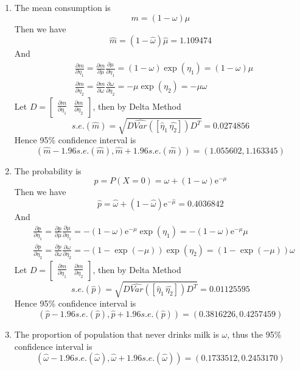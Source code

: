 \documentclass{article}
\begin{document}
\begin{enumerate}[leftmargin = 0 em, label = \arabic*., font = \bfseries]
\begin{enumerate}
		   \item 
		   The mean consumption is
		   \[m = (1 - \omega) \mu\]
		   Then we have
		   \[\hat{m} = (1 - \hat{\omega}) \hat{\mu} = 1.109474 \]
		   And
		   \begin{align*}
		    &\frac{\partial m}{\partial \eta_1} = \frac{\partial m}{\partial \mu} \frac{\partial \mu}{\partial \eta_1} = (1 - \omega) \exp(\eta_1) = (1 - \omega) \mu\\
		    & \frac{\partial m}{\partial \eta_2} = \frac{\partial m}{\partial \omega} \frac{\partial \omega}{\partial \eta_2} = -\mu \exp(\eta_2) = -\mu \omega
		    \end{align*}
		    Let $D = \begin{bmatrix}
		    	\frac{\partial m}{\partial \eta_1}&\frac{\partial m}{\partial \eta_2}
		    \end{bmatrix}$, then by Delta Method
		    \[s.e.(\hat{m}) = \sqrt{D\widehat{Var}([\hat{\eta}_1\, \hat{\eta_2}])D^T} = 0.0274856\]
		    Hence 95\% confidence interval is
		    \[(\hat{m} - 1.96 s.e.(\hat{m}), \hat{m} + 1.96 s.e. (\hat{m})) = (1.055602, 1.163345)\]

		    \item 
            The probability is
		   \[p = P(X = 0) = \omega + (1 - \omega)\mathrm{e}^{-\mu}\]
		   Then we have
		   \[\hat{p} = \hat{\omega} + (1 -\hat{\omega}) \mathrm{e}^{-\hat{\mu}} = 0.4036842  \]
		   And
		   \begin{align*}
		    &\frac{\partial p}{\partial \eta_1} = \frac{\partial p}{\partial \mu} \frac{\partial \mu}{\partial \eta_1} = -(1 - \omega)\mathrm{e}^{-\mu} \exp(\eta_1) = -(1 - \omega)\mathrm{e}^{-\mu}\mu\\
		    & \frac{\partial p}{\partial \eta_2} = \frac{\partial p}{\partial \omega} \frac{\partial \omega}{\partial \eta_2} = -(1 - \exp(-\mu)) \exp(\eta_2) = (1 - \exp(-\mu)) \omega
		    \end{align*}
		    Let $D = \begin{bmatrix}
		    	\frac{\partial m}{\partial \eta_1}&\frac{\partial m}{\partial \eta_2}
		    \end{bmatrix}$, then by Delta Method
		    \[s.e.(\hat{p}) = \sqrt{D\widehat{Var}([\hat{\eta}_1\, \hat{\eta_2}])D^T} = 0.01125595\]
		    Hence 95\% confidence interval is
		    \[(\hat{p} - 1.96 s.e.(\hat{p}), \hat{p} + 1.96 s.e. (\hat{p})) = (0.3816226, 0.4257459)\]

		    \item 
		    The proportion of population that never drinks milk is $\omega$, thus the 95\% confidence interval is
		    \[(\hat{\omega} - 1.96 s.e.(\hat{\omega}) , \hat{\omega} + 1.96 s.e.(\hat{\omega}) ) = (0.1733512, 0.2453170 )\]


\end{enumerate}
\end{enumerate}
\end{document}
